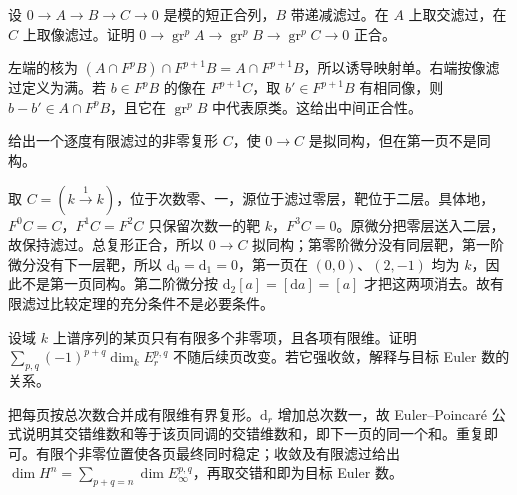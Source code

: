\begin{exercise}\label{b4:ex:14-induced-filtrations}
	设 \(0\to A\to B\to C\to0\) 是模的短正合列，\(B\) 带递减滤过。在 \(A\) 上取交滤过，在 \(C\) 上取像滤过。证明 \(0\to\operatorname{gr}^pA\to\operatorname{gr}^pB\to\operatorname{gr}^pC\to0\) 正合。
\end{exercise}
\begin{solution}
	左端的核为 \((A\cap F^pB)\cap F^{p+1}B=A\cap F^{p+1}B\)，所以诱导映射单。右端按像滤过定义为满。若 \(b\in F^pB\) 的像在 \(F^{p+1}C\)，取 \(b'\in F^{p+1}B\) 有相同像，则 \(b-b'\in A\cap F^pB\)，且它在 \(\operatorname{gr}^pB\) 中代表原类。这给出中间正合性。
\end{solution}

\begin{exercise}\label{b4:ex:14-quasi-not-page}
	给出一个逐度有限滤过的非零复形 \(C\)，使 \(0\to C\) 是拟同构，但在第一页不是同构。
\end{exercise}
\begin{solution}
	取 \(C=(k\xrightarrow{1}k)\)，位于次数零、一，源位于滤过零层，靶位于二层。具体地，\(F^0C=C\)，\(F^1C=F^2C\) 只保留次数一的靶 \(k\)，\(F^3C=0\)。原微分把零层送入二层，故保持滤过。总复形正合，所以 \(0\to C\) 拟同构；第零阶微分没有同层靶，第一阶微分没有下一层靶，所以 \(\mathrm d_0=\mathrm d_1=0\)，第一页在 \((0,0)\)、\((2,-1)\) 均为 \(k\)，因此不是第一页同构。第二阶微分按 \(\mathrm d_2[a]=[\mathrm da]=[a]\) 才把这两项消去。故有限滤过比较定理的充分条件不是必要条件。
\end{solution}

\begin{exercise}\label{b4:ex:14-euler-pages}
	设域 \(k\) 上谱序列的某页只有有限多个非零项，且各项有限维。证明 \(\sum_{p,q}(-1)^{p+q}\dim_k E_r^{p,q}\) 不随后续页改变。若它强收敛，解释与目标 Euler 数的关系。
\end{exercise}
\begin{solution}
	把每页按总次数合并成有限维有界复形。\(\mathrm{d}_r\) 增加总次数一，故 Euler--Poincaré 公式说明其交错维数和等于该页同调的交错维数和，即下一页的同一个和。重复即可。有限个非零位置使各页最终同时稳定；收敛及有限滤过给出 \(\dim H^n=\sum_{p+q=n}\dim E_\infty^{p,q}\)，再取交错和即为目标 Euler 数。
\end{solution}

